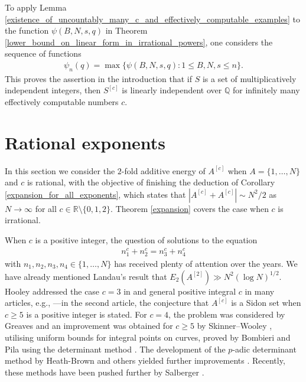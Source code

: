 \documentclass[9pt]{amsart}
\theoremstyle{my_theorem_style}
\numberwithin{definition}{section}
\newcommand{\Q}{\mathbb{Q}}
\newcommand{\R}{\mathbb{R}}
\begin{document}
To apply Lemma \ref{existence_of_uncountably_many_c_and_effectively_computable_examples} to the function $\psi(B, N, s, q)$ in Theorem \ref{lower_bound_on_linear_form_in_irrational_powers}, one considers the sequence of functions
\begin{align*}
    \psi_n(q) = \max \{\psi(B, N, s, q) : 1 \leq B, N, s \leq n\}.
\end{align*}
This proves the assertion in the introduction that if $S$ is a set of multiplicatively independent integers, then $S^{[c]}$ is linearly independent over $\Q$ for infinitely many effectively computable numbers $c$.
\section{Rational exponents}
\label{rational_exponents}

In this section we consider the $2$-fold additive energy of $A^{[c]}$ when $A = \{1, \dots, N\}$ and $c$ is rational, with the objective of finishing the deduction of Corollary \ref{expansion_for_all_exponents}, which states that $|A^{[c]} + A^{[c]}| \sim N^2/2$ as $N \to \infty$ for all $c \in \R \setminus \{0, 1, 2\}$. Theorem \ref{expansion} covers the case when $c$ is irrational.

When $c$ is a positive integer, the question of solutions to the equation
\begin{align}
\label{energy_equation_rational_exponents}
    n_1^c + n_2^c = n_3^c + n_4^c
\end{align}
with $n_1, n_2, n_3, n_4 \in \{1, \dots, N\}$ has received plenty of attention over the years. We have already mentioned Landau's result \cite{Landau_on_the_partition_of_positive_integers_in_four_classes_according_to_the_minimal_number_of_squares_needed_to_their_additive_composition} that $E_2(A^{[2]}) \gg N^2(\log{N})^{1/2}$. Hooley addressed the case $c = 3$ in \cite{Hooley_on_the_representations_of_a_number_as_a_sum_of_two_cubes, Hooley_on_the_numbers_that_are_representable_as_the_sum_of_two_cubes} and general positive integral $c$ in many articles, e.g., \cite{Hooley_on_the_representation_of_a_number_as_the_sum_of_two_h-th_powers, Hooley_on_another_sieve_method_and_the_numbers_that_are_a_sum_of_two_h-th_powers}---in the second article, the conjecture that $A^{[c]}$ is a Sidon set when $c \geq 5$ is a positive integer is stated. For $c = 4$, the problem was considered by Greaves \cite{Greaves_on_the_representation_of_a_number_as_a_sum_of_two_fourth_powers} and an improvement was obtained for $c \geq 5$ by Skinner--Wooley \cite{Skinner--Wooley_sums_of_two_kth_powers}, utilising uniform bounds for integral points on curves, proved by Bombieri and Pila using the determinant method \cite{Bombieri--Pila}. The development of the $p$-adic determinant method by Heath-Brown and others yielded further improvements \cite{Heath-Brown_the_density_of_rational_points_on_curves_and_surfaces, Browning_equal_sums_of_two_kth_powers}. Recently, these methods have been pushed further by Salberger \cite{Salberger_counting_rational_points_on_projective_varieties}.
\end{document}
